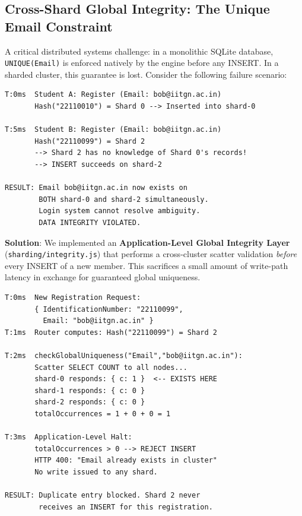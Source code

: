 \documentclass[sigconf]{acmart}
\begin{document}
\subsection{Cross-Shard Global Integrity: The Unique Email Constraint}
\label{subsec:integrity}

A critical distributed systems challenge: in a monolithic SQLite database, \texttt{UNIQUE(Email)} is enforced natively by the engine before any INSERT. In a sharded cluster, this guarantee is lost. Consider the following failure scenario:

\begin{lstlisting}[style=logstyle, caption={Distributed Uniqueness Violation Without Integrity Layer}]
T:0ms  Student A: Register (Email: bob@iitgn.ac.in)
       Hash("22110010") = Shard 0 --> Inserted into shard-0

T:5ms  Student B: Register (Email: bob@iitgn.ac.in)
       Hash("22110099") = Shard 2
       --> Shard 2 has no knowledge of Shard 0's records!
       --> INSERT succeeds on shard-2

RESULT: Email bob@iitgn.ac.in now exists on
        BOTH shard-0 and shard-2 simultaneously.
        Login system cannot resolve ambiguity.
        DATA INTEGRITY VIOLATED.
\end{lstlisting}

\textbf{Solution}: We implemented an \textbf{Application-Level Global Integrity Layer} (\texttt{sharding/integrity.js}) that performs a cross-cluster scatter validation \textit{before} every INSERT of a new member. This sacrifices a small amount of write-path latency in exchange for guaranteed global uniqueness.

\begin{lstlisting}[style=logstyle, caption={Application-Level Global Integrity Validation Timeline}]
T:0ms  New Registration Request:
       { IdentificationNumber: "22110099",
         Email: "bob@iitgn.ac.in" }
T:1ms  Router computes: Hash("22110099") = Shard 2

T:2ms  checkGlobalUniqueness("Email","bob@iitgn.ac.in"):
       Scatter SELECT COUNT to all nodes...
       shard-0 responds: { c: 1 }  <-- EXISTS HERE
       shard-1 responds: { c: 0 }
       shard-2 responds: { c: 0 }
       totalOccurrences = 1 + 0 + 0 = 1

T:3ms  Application-Level Halt:
       totalOccurrences > 0 --> REJECT INSERT
       HTTP 400: "Email already exists in cluster"
       No write issued to any shard.

RESULT: Duplicate entry blocked. Shard 2 never
        receives an INSERT for this registration.
\end{lstlisting}
\end{document}
